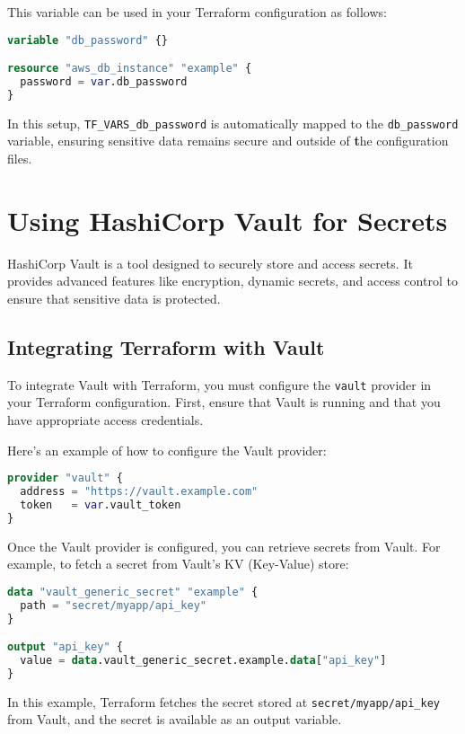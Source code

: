 This variable can be used in your Terraform configuration as follows:

\begin{lstlisting}[language=terraform]
variable "db_password" {}

resource "aws_db_instance" "example" {
  password = var.db_password
}
\end{lstlisting}

In this setup, \texttt{TF\_VARS\_db\_password} is automatically mapped to the \texttt{db\_password} variable, ensuring sensitive data remains secure and outside of \textbf{t}he configuration files.

\section{Using HashiCorp Vault for Secrets}

HashiCorp Vault is a tool designed to securely store and access secrets. It provides advanced features like encryption, dynamic secrets, and access control to ensure that sensitive data is protected.

\subsection{Integrating Terraform with Vault}

To integrate Vault with Terraform, you must configure the \texttt{vault} provider in your Terraform configuration. First, ensure that Vault is running and that you have appropriate access credentials.

Here's an example of how to configure the Vault provider:

\begin{lstlisting}[language=terraform]
provider "vault" {
  address = "https://vault.example.com"
  token   = var.vault_token
}
\end{lstlisting}

Once the Vault provider is configured, you can retrieve secrets from Vault. For example, to fetch a secret from Vault's KV (Key-Value) store:

\begin{lstlisting}[language=terraform]
data "vault_generic_secret" "example" {
  path = "secret/myapp/api_key"
}

output "api_key" {
  value = data.vault_generic_secret.example.data["api_key"]
}
\end{lstlisting}

In this example, Terraform fetches the secret stored at \texttt{secret/myapp/api\_key} from Vault, and the secret is available as an output variable.


